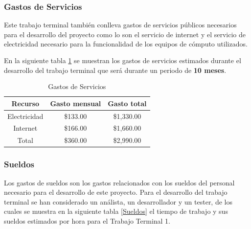 \subsubsection{Gastos de Servicios}
Este trabajo terminal también conlleva gastos de servicios públicos necesarios para el desarrollo del proyecto como lo son el servicio de internet y el servicio de electricidad necesario para la funcionalidad de los equipos de cómputo utilizados.

En la siguiente tabla \ref{GastosServicios} se muestran los gastos de servicios estimados durante el desarrollo del trabajo terminal que será durante un periodo de \textbf{10 meses}.

\begin{table}[H]
	\centering
	\resizebox{10cm}{!} {
		\begin{tabular}{|c|c|c|}
			\hline
			\multicolumn{1}{|c|}{Recurso} & Gasto mensual & Gasto total\\ \hline
			Electricidad & \$133.00  & \$1,330.00 \\ \hline
			Internet & \$166.00  & \$1,660.00 \\ \hline
			Total  & \$360.00 & \$2,990.00 \\ \hline
			
		\end{tabular}
	}
	\caption{Gastos de Servicios}
	\label{GastosServicios}
\end{table} 

\subsubsection{Sueldos}
Los gastos de sueldos son los gastos relacionados con los sueldos del personal necesario para el desarrollo de este proyecto. Para el desarrollo del trabajo terminal se han considerado un análista, un desarrollador y un tester, de los cuales se muestra en la siguiente tabla \ref{Sueldos} el tiempo de trabajo y sus sueldos estimados por hora para el Trabajo Terminal 1.

